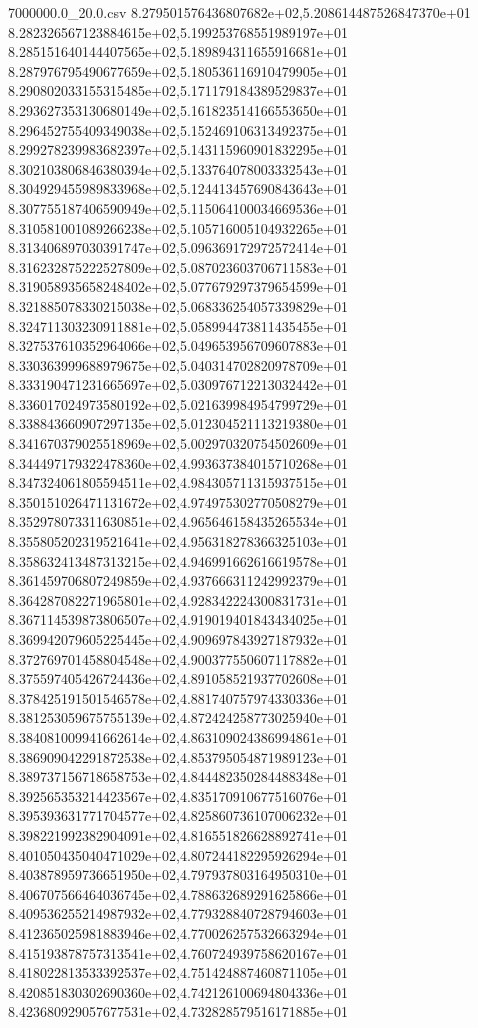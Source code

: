 \begin{filecontents*}{7000000.0_20.0.csv}
8.279501576436807682e+02,5.208614487526847370e+01
8.282326567123884615e+02,5.199253768551989197e+01
8.285151640144407565e+02,5.189894311655916681e+01
8.287976795490677659e+02,5.180536116910479905e+01
8.290802033155315485e+02,5.171179184389529837e+01
8.293627353130680149e+02,5.161823514166553650e+01
8.296452755409349038e+02,5.152469106313492375e+01
8.299278239983682397e+02,5.143115960901832295e+01
8.302103806846380394e+02,5.133764078003332543e+01
8.304929455989833968e+02,5.124413457690843643e+01
8.307755187406590949e+02,5.115064100034669536e+01
8.310581001089266238e+02,5.105716005104932265e+01
8.313406897030391747e+02,5.096369172972572414e+01
8.316232875222527809e+02,5.087023603706711583e+01
8.319058935658248402e+02,5.077679297379654599e+01
8.321885078330215038e+02,5.068336254057339829e+01
8.324711303230911881e+02,5.058994473811435455e+01
8.327537610352964066e+02,5.049653956709607883e+01
8.330363999688979675e+02,5.040314702820978709e+01
8.333190471231665697e+02,5.030976712213032442e+01
8.336017024973580192e+02,5.021639984954799729e+01
8.338843660907297135e+02,5.012304521113219380e+01
8.341670379025518969e+02,5.002970320754502609e+01
8.344497179322478360e+02,4.993637384015710268e+01
8.347324061805594511e+02,4.984305711315937515e+01
8.350151026471131672e+02,4.974975302770508279e+01
8.352978073311630851e+02,4.965646158435265534e+01
8.355805202319521641e+02,4.956318278366325103e+01
8.358632413487313215e+02,4.946991662616619578e+01
8.361459706807249859e+02,4.937666311242992379e+01
8.364287082271965801e+02,4.928342224300831731e+01
8.367114539873806507e+02,4.919019401843434025e+01
8.369942079605225445e+02,4.909697843927187932e+01
8.372769701458804548e+02,4.900377550607117882e+01
8.375597405426724436e+02,4.891058521937702608e+01
8.378425191501546578e+02,4.881740757974330336e+01
8.381253059675755139e+02,4.872424258773025940e+01
8.384081009941662614e+02,4.863109024386994861e+01
8.386909042291872538e+02,4.853795054871989123e+01
8.389737156718658753e+02,4.844482350284488348e+01
8.392565353214423567e+02,4.835170910677516076e+01
8.395393631771704577e+02,4.825860736107006232e+01
8.398221992382904091e+02,4.816551826628892741e+01
8.401050435040471029e+02,4.807244182295926294e+01
8.403878959736651950e+02,4.797937803164950310e+01
8.406707566464036745e+02,4.788632689291625866e+01
8.409536255214987932e+02,4.779328840728794603e+01
8.412365025981883946e+02,4.770026257532663294e+01
8.415193878757313541e+02,4.760724939758620167e+01
8.418022813533392537e+02,4.751424887460871105e+01
8.420851830302690360e+02,4.742126100694804336e+01
8.423680929057677531e+02,4.732828579516171885e+01

\end{filecontents*}
